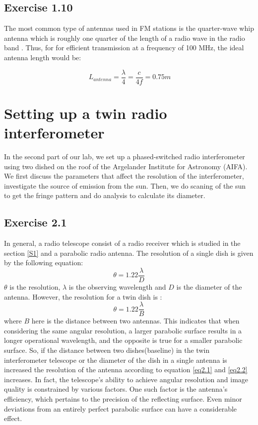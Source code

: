 \documentclass[12pt]{article}
\begin{document}
\subsection{Exercise 1.10}
The most common type of antennas used in FM stations is the quarter-wave whip antenna which is roughly one quarter of the length of a radio wave in the radio band \cite{antennas}. Thus, for for efficient transmission at a frequency of 100 MHz, the ideal antenna length would be: 

\begin{equation}
\ L_{antenna} = \frac{\lambda}{4} = \frac{c}{4f} = 0.75 m
\end{equation}

 \section{Setting up a twin radio interferometer}
 In the second part of our lab, we set up a phased-switched radio interferometer using two dished on the roof of the Argelander Institute for Astronomy (AIFA). We first discuss the parameters that affect the resolution of the interferometer, investigate the source of emission from the sun. Then, we do scaning of the sun to get the fringe pattern and do analysis to calculate its diameter.
 
 \subsection{Exercise 2.1}
 In general, a radio telescope consist of a radio receiver which is studied in the section \ref{S1} and a parabolic radio antenna. The resolution of a single dish is given by the following equation\parencite{lecturenote}:
 \begin{equation}
 \label{eq2.1}
 \theta = 1.22 \dfrac{\lambda}{D}
 \end{equation}
 $\theta$ is the resolution, $\lambda$ is the observing wavelength and $D$ is the diameter of the antenna. However, the resolution for a twin dish is\parencite{lecturenote} :
  \begin{equation}
 \label{eq2.2}
 \theta = 1.22 \dfrac{\lambda}{B}
 \end{equation}
 where $B$ here is the distance between two antennas. This indicates that when considering the same angular resolution, a larger parabolic surface results in a longer operational wavelength, and the opposite is true for a smaller parabolic surface. So, if the distance between two dishes(baseline) in the twin interferometer telescope or the diameter of the dish in a single antenna is increased the resolution of the antenna according to equation \ref{eq2.1} and \ref{eq2.2} increases. In fact, the telescope's ability to achieve angular resolution and image quality is constrained by various factors. One such factor is the antenna's efficiency, which pertains to the precision of the reflecting surface. Even minor deviations from an entirely perfect parabolic surface can have a considerable effect. 
\end{document}
